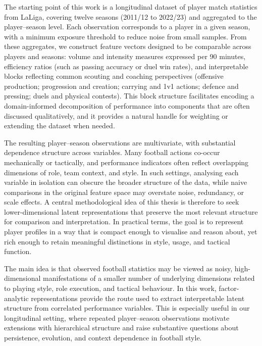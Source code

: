 \documentclass{fmetfm}
\begin{document}
The starting point of this work is a longitudinal dataset of player match statistics from LaLiga, covering twelve seasons (2011/12 to 2022/23) and aggregated to the player--season level. Each observation corresponds to a player in a given season, with a minimum exposure threshold to reduce noise from small samples. From these aggregates, we construct feature vectors designed to be comparable across players and seasons: volume and intensity measures expressed per 90 minutes, efficiency ratios (such as passing accuracy or duel win rates), and interpretable blocks reflecting common scouting and coaching perspectives (offensive production; progression and creation; carrying and 1v1 actions; defence and pressing; duels and physical contests). This block structure facilitates encoding a domain-informed decomposition of performance into components that are often discussed qualitatively, and it provides a natural handle for weighting or extending the dataset when needed.

The resulting player--season observations are multivariate, with substantial dependence structure across variables. Many football actions co-occur mechanically or tactically, and performance indicators often reflect overlapping dimensions of role, team context, and style. In such settings, analysing each variable in isolation can obscure the broader structure of the data, while naive comparisons in the original feature space may overstate noise, redundancy, or scale effects. A central methodological idea of this thesis is therefore to seek lower-dimensional latent representations that preserve the most relevant structure for comparison and interpretation. In practical terms, the goal is to represent player profiles in a way that is compact enough to visualise and reason about, yet rich enough to retain meaningful distinctions in style, usage, and tactical function.

The main idea is that observed football statistics may be viewed as noisy, high-dimensional manifestations of a smaller number of underlying dimensions related to playing style, role execution, and tactical behaviour. In this work, factor-analytic representations provide the route used to extract interpretable latent structure from correlated performance variables. This is especially useful in our longitudinal setting, where repeated player--season observations motivate extensions with hierarchical structure and raise substantive questions about persistence, evolution, and context dependence in football style.
\end{document}
